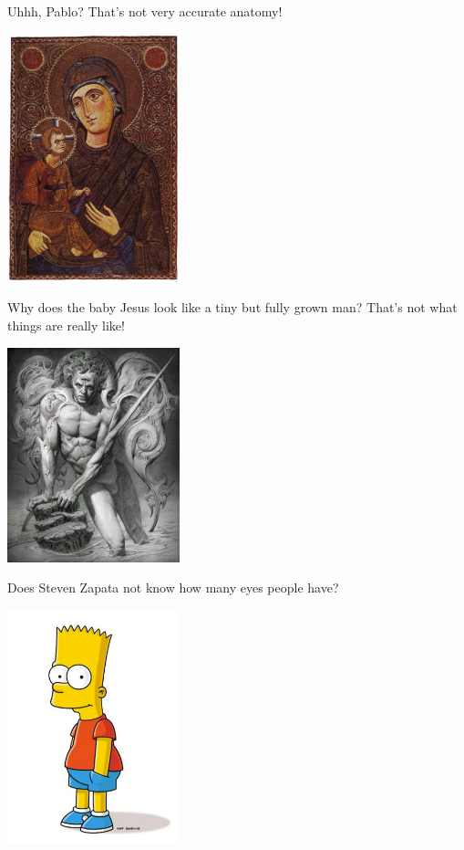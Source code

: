 \documentclass[11pt]{article}
\begin{document}
Uhhh, Pablo? That's not very accurate anatomy!

\begin{center}
\includegraphics[width=5cm]{./images/jesus-adult.jpg}
\end{center}

Why does the baby Jesus look like a tiny but fully grown man? That's not what things are really like!

\begin{center}
\includegraphics[width=5cm]{./images/zapata-three-eyes.png}
\end{center}

Does Steven Zapata not know how many eyes people have?

\begin{center}
\includegraphics[width=5cm]{./images/bart simpson.png}
\end{center}
\end{document}
